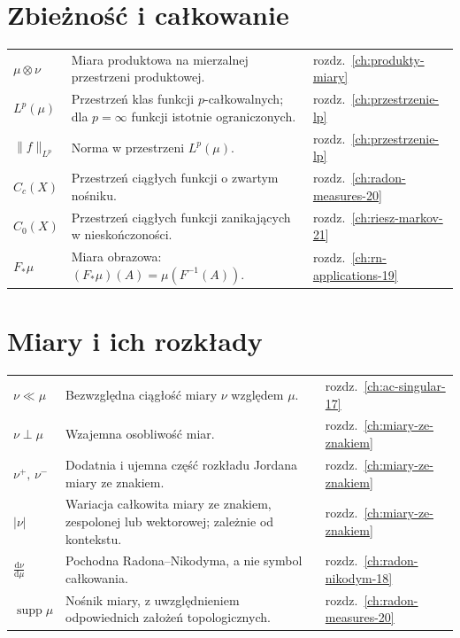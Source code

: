 \documentclass[11pt,a4paper,oneside]{book}
\numberwithin{equation}{chapter}
\theoremstyle{plain}
\theoremstyle{definition}
\theoremstyle{remark}
\begin{document}
\section*{Zbieżność i całkowanie}
\begin{longtable}{@{}p{}p{}p{}@{}}
$\mu\otimes\nu$ & Miara produktowa na mierzalnej przestrzeni produktowej. & rozdz.~\ref{ch:produkty-miary} \\
$L^p(\mu)$ & Przestrzeń klas funkcji $p$-całkowalnych; dla $p=\infty$ funkcji istotnie ograniczonych. & rozdz.~\ref{ch:przestrzenie-lp} \\
$\|f\|_{L^p}$ & Norma w przestrzeni $L^p(\mu)$. & rozdz.~\ref{ch:przestrzenie-lp} \\
$C_c(X)$ & Przestrzeń ciągłych funkcji o zwartym nośniku. & rozdz.~\ref{ch:radon-measures-20} \\
$C_0(X)$ & Przestrzeń ciągłych funkcji zanikających w nieskończoności. & rozdz.~\ref{ch:riesz-markov-21} \\
$F_*\mu$ & Miara obrazowa: $(F_*\mu)(A)=\mu(F^{-1}(A))$. & rozdz.~\ref{ch:rn-applications-19} \\
\end{longtable}

\section*{Miary i ich rozkłady}
\begin{longtable}{@{}p{}p{}p{}@{}}
$\nu\ll\mu$ & Bezwzględna ciągłość miary $\nu$ względem $\mu$. & rozdz.~\ref{ch:ac-singular-17} \\
$\nu\perp\mu$ & Wzajemna osobliwość miar. & rozdz.~\ref{ch:miary-ze-znakiem} \\
$\nu^+,\,\nu^-$ & Dodatnia i ujemna część rozkładu Jordana miary ze znakiem. & rozdz.~\ref{ch:miary-ze-znakiem} \\
$|\nu|$ & Wariacja całkowita miary ze znakiem, zespolonej lub wektorowej; zależnie od kontekstu. & rozdz.~\ref{ch:miary-ze-znakiem} \\
$\frac{\mathrm d\nu}{\mathrm d\mu}$ & Pochodna Radona--Nikodyma, a nie symbol całkowania. & rozdz.~\ref{ch:radon-nikodym-18} \\
$\operatorname{supp}\mu$ & Nośnik miary, z uwzględnieniem odpowiednich założeń topologicznych. & rozdz.~\ref{ch:radon-measures-20} \\
\end{longtable}
\end{document}
